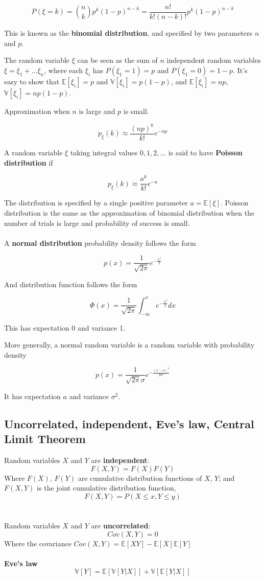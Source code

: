 \documentclass{article}
\begin{document}
$$
P(\xi = k) = \binom{n}{k} p^k (1 - p)^{n - k} = \frac{n!}{k! (n - k)!} p^k (1 - p)^{n - k}
$$

This is known as the \textbf{binomial distribution}, and specified by two parameters $n$ and $p$.

The random variable $\xi$ can be seen as the sum of $n$ independent random variables $\xi = \xi_1 + \dots \xi_n$, where each $\xi_i$ has $P(\xi_1 = 1) = p$ and $P(\xi_1 = 0) = 1 - p$.
It's easy to show that $\mathbb{E}[\xi_i] = p$ and $\mathbb{V}[\xi_i] = p (1 - p)$, and $\mathbb{E}[\xi_i] = n p$, $\mathbb{V}[\xi_i] = n p (1 - p)$.

Approximation when $n$ is large and $p$ is small.

$$
p_{\xi}(k) \approx \frac{(n p)^k}{k!} e^{- n p}
$$

A random variable $\xi$ taking integral values $0, 1, 2, \dots$ is said to have \textbf{Poisson distribution} if

$$
p_{\xi}(k) \approx \frac{a^k}{k!} e^{-a}
$$

The distribution is specified by a single positive parameter $a = \mathbb{E}[\xi]$.
Poisson distribution is the same as the approximation of binomial distribution when the number of trials is large and probability of success is small.
\\
\\
A \textbf{normal distribution} probability density follows the form

$$
p(x) = \frac{1}{\sqrt{2 \pi}} e^{-\frac{x^2}{2}}
$$

And distribution function follows the form

$$
\Phi(x) = \frac{1}{\sqrt{2 \pi}} \int_{-\infty}^{x}{e^{-\frac{x^2}{2}} dx}
$$

This has expectation 0 and variance 1.

More generally, a normal random variable is a random variable with probability density

$$
p(x) = \frac{1}{\sqrt{2 \pi} \sigma} e^{-\frac{(x - a)^2}{2 \sigma^2}}
$$

It has expectation $a$ and variance $\sigma^2$.


\subsection{Uncorrelated, independent, Eve's law, Central Limit Theorem}

Random variables $X$ and $Y$ are \textbf{independent}:
$$
F(X, Y) = F(X) F(Y)
$$
Where $F(X)$, $F(Y)$ are cumulative distribution functions of $X$, $Y$; and $F(X, Y)$ is the joint cumulative distribution function,
$$
F(X, Y) = P(X \leq x, Y \leq y)
$$
\\
\\
Random variables $X$ and $Y$ are \textbf{uncorrelated}:
$$
Cov(X, Y) = 0
$$
Where the covariance $Cov(X, Y) = \mathbb{E}[XY] - \mathbb{E}[X]\mathbb{E}[Y]$
\\
\\
\textbf{Eve's law}
$$
\mathbb{V}[Y] = \mathbb{E}[\mathbb{V}[Y | X]] + \mathbb{V}[\mathbb{E}[Y | X]]
$$
\end{document}
